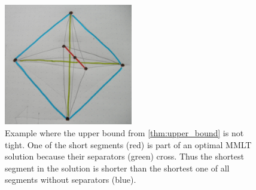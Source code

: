 \begin{figure}[ht]
  \centering
  \includegraphics[width=0.5\textwidth]{img/upper_bound_tightness.jpg}
  \caption{
    \label{fig:upper_bound_tightness}
    Example where the upper bound from \cref{thm:upper_bound} is not 
    tight. One of the short segments (red) is part of an optimal 
    \gls{MMLT} solution because their separators (green) cross. Thus
    the shortest segment in the solution is shorter than the shortest
    one of all segments without separators (blue).
  }
\end{figure}  


